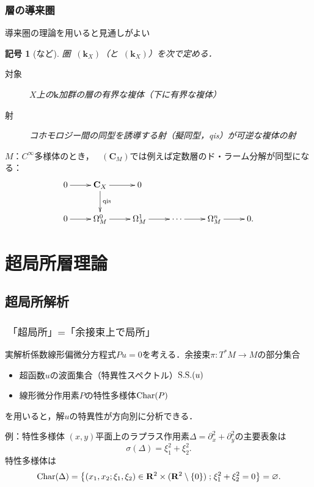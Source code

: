 \documentclass[dvipdfmx,10pt,aspectratio=169,leqno]{beamer}%
\newcommand{\rr}{\mathbf{R}}
\newcommand{\cc}{\mathbf{C}}
\newcommand{\kk}{\mathbf{k}}
\numberwithin{equation}{subsection}
\newcommand{\Dompl}{\mathop{\mathsf{D}^\mathrm{+}}\nolimits}
\newcommand{\Dompb}{\mathop{\mathsf{D}^\mathrm{b}}\nolimits}
\newcommand{\muS}[1][]{\mathop{\mathrm{SS}}\nolimits_{#1}}
\newcommand{\cotb}[1][]{T^{\ast}{#1}}
\theoremstyle{mystyle}
\newtheorem{NTN}[AXM]{記号}
\newcommand{\smid}{\mathrel{;}}
\begin{document}
\begin{frame}
  \frametitle{層の導来圏}
  導来圏の理論を用いると見通しがよい
  \begin{NTN}[{\cite{KS90}など}]
    圏\(\Dompb(\kk_X)\)（と\(\Dompl(\kk_X)\)）を次で定める．
    \begin{description}
      \item[対象] \(X\)上の\(\kk\)加群の層の有界な複体（下に有界な複体）
      \item[射] コホモロジー間の同型を誘導する射（擬同型，qis）が可逆な複体の射
    \end{description}
  \end{NTN}\pause
  \(M\)：\(C^{\infty}\)多様体のとき，
  \(\Dompb(\cc_M)\)では例えば定数層のド・ラーム分解が同型になる：
  \[\vcenter{\xymatrix{
    0\ar[r]&
    \cc_X \ar[r] \ar[d]^-{\mathrm{qis}}&
    0\\
    0\ar[r]&
    \Omega_M^0\ar[r]&
    \Omega_M^1\ar[r]&
    \cdots\ar[r]&
    \Omega_M^n\ar[r]&0.
  }}\]
\end{frame}
\section{超局所層理論}
\subsection{超局所解析}

\begin{frame}
  \frametitle{\(\text{「超局所」}=\text{「余接束上で局所」}\)}

  実解析係数線形偏微分方程式\(Pu=0\)を考える．余接束\(\pi\colon\cotb[M]\to M\)の部分集合
  \begin{itemize}
    \item 超函数\(u\)の波面集合（特異性スペクトル）\(\mathop{\mathrm{S.S.}}\nolimits(u)\)
    \item 線形微分作用素\(P\)の特性多様体\(\mathop{\mathrm{Char}}\nolimits(P)\)
  \end{itemize}
  を用いると，解\(u\)の特異性が方向別に分析できる．
  \pause

  \begin{exampleblock}{例：特性多様体}
    \((x,y)\)平面上のラプラス作用素\(
      \Delta=\partial^2_x+\partial^2_y
    \)の主要表象は\[
      \sigma(\Delta)=\xi_1^2+\xi_2^2.
    \]
    特性多様体は\[
      \Char(\Delta)
      =\left\{
        (x_1,x_2;\xi_1,\xi_2)
        \in \rr^{2}\times(\rr^2\setminus \{0\})
        \smid\xi_1^2+\xi_2^2=0
      \right\}
      =\varnothing.
    \]
  \end{exampleblock}

\end{frame}
\end{document}

